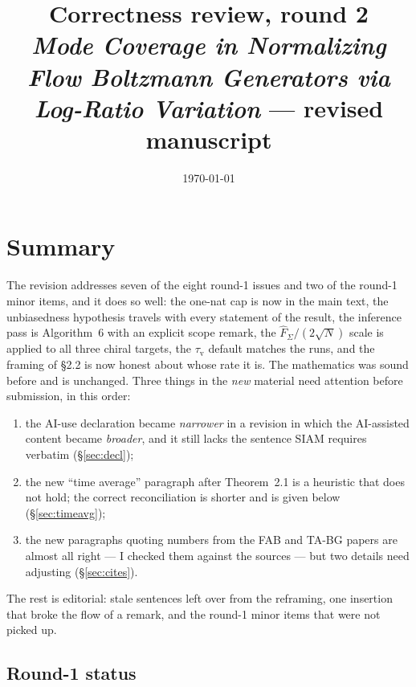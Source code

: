 \documentclass[11pt]{article}
\title{\bf Correctness review, round 2\\[3pt]
\large \emph{Mode Coverage in Normalizing Flow Boltzmann Generators via
Log-Ratio Variation} --- revised manuscript}
\author{}
\date{\today}
\begin{document}
\maketitle
\vspace{-3em}

\section*{Summary}

The revision addresses seven of the eight round-1 issues and two of the round-1
minor items, and it does so well: the one-nat cap is now in the main text, the
unbiasedness hypothesis travels with every statement of the result, the
inference pass is Algorithm~6 with an explicit scope remark, the
$\hat F_\Sigma/(2\sqrt N)$ scale is applied to all three chiral targets, the
$\tau_{\mathrm v}$ default matches the runs, and the framing of \S2.2 is now
honest about whose rate it is. The mathematics was sound before and is
unchanged. Three things in the \emph{new} material need attention before
submission, in this order:

\begin{enumerate}[leftmargin=*,itemsep=2pt]
\item the AI-use declaration became \emph{narrower} in a revision in which the
      AI-assisted content became \emph{broader}, and it still lacks the sentence
      SIAM requires verbatim (\S\ref{sec:decl});
\item the new ``time average'' paragraph after Theorem~2.1 is a heuristic that
      does not hold; the correct reconciliation is shorter and is given below
      (\S\ref{sec:timeavg});
\item the new paragraphs quoting numbers from the FAB and TA-BG papers are
      almost all right --- I checked them against the sources --- but two
      details need adjusting (\S\ref{sec:cites}).
\end{enumerate}

\noindent
The rest is editorial: stale sentences left over from the reframing, one
insertion that broke the flow of a remark, and the round-1 minor items that
were not picked up.

\subsection*{Round-1 status}
\end{document}
